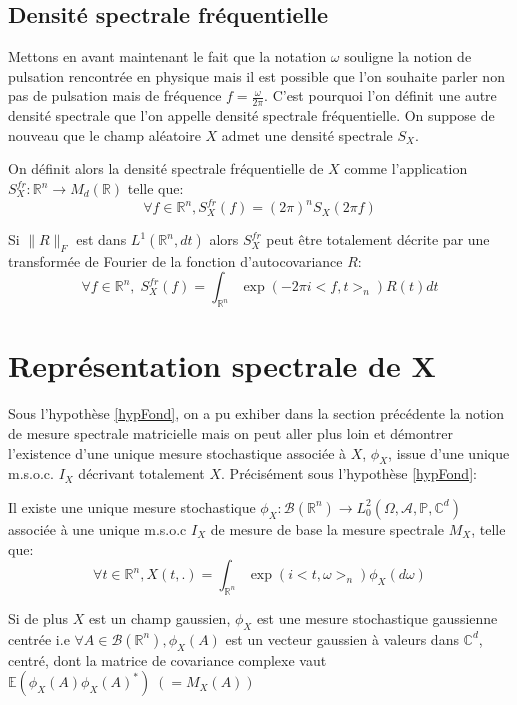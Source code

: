 \subsection{Densité spectrale fréquentielle}
\label{DSFr}
Mettons en avant maintenant le fait que la notation $\omega$ souligne la notion de pulsation rencontrée en physique mais il est possible que l'on souhaite parler non pas de pulsation mais de fréquence $f = \frac{\omega}{2\pi}$. C'est pourquoi l'on définit une autre densité spectrale que l'on appelle densité spectrale fréquentielle. On suppose de nouveau que le champ aléatoire $X$ admet une densité spectrale $S_X$.

\begin{definition}
On définit alors la densité spectrale fréquentielle de $X$ comme l'application $S^{fr}_X : \mathbb{R}^n \rightarrow M_d(\mathbb{R})$ telle que:
\begin{equation*}
\forall f \in \mathbb{R}^n, S^{fr}_X(f) = (2\pi)^{n}S_X(2\pi f)
\end{equation*}
\end{definition}

\begin{property}
Si $\|R\|_F$ est dans $L^1(\mathbb{R}^n,dt)$ alors $S^{fr}_X$ peut être totalement
décrite par une transformée de Fourier de la fonction d'autocovariance $R$: \begin{equation*} \forall f \in \mathbb{R}^n,\;  S^{fr}_X(f) = \displaystyle\int_{\mathbb{R}^n} \exp(-2\pi i<f,t>_n)R(t) dt \end{equation*}
\end{property}


\section{Représentation spectrale de X}
\label{repSpecSect}
Sous l'hypothèse \ref{hypFond}, on a pu exhiber dans la section précédente la notion de mesure spectrale matricielle mais on peut aller plus loin et démontrer l'existence d'une unique mesure stochastique associée à $X$, $\phi_X$, issue d'une unique m.s.o.c. $I_X$ décrivant totalement $X$. Précisément sous l'hypothèse \ref{hypFond}:

\begin{theorem}
\label{repSpec} Il existe une unique mesure stochastique $\phi_X : \mathcal{B}(\mathbb{R}^n) \rightarrow L^{2}_{0}(\Omega, \mathcal{A}, \mathbb{P}, \mathbb{C}^{d})$ associée à une unique m.s.o.c $I_X$ de mesure de base la mesure spectrale $M_X$, telle que:
\begin{equation*}
\forall t \in \mathbb{R}^n, X(t,.) = \displaystyle\int_{\mathbb{R}^n} \exp(i<t,\omega>_{n}) \phi_X(d\omega)
\end{equation*}

\noindent Si de plus $X$ est un champ gaussien, $\phi_X$ est une mesure stochastique gaussienne centrée i.e $\forall A \in \mathcal{B}(\mathbb{R}^n), \phi_X(A)$ est un vecteur gaussien à valeurs dans $\mathbb{C}^d$, centré, dont la matrice de covariance complexe vaut $\mathbb{E}(\phi_X(A)\phi_X(A)^{*}) \; ( = M_X(A))$
\end{theorem}

